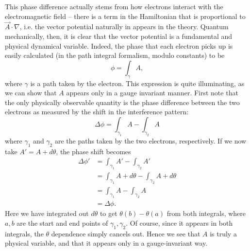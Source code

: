 \documentclass[12pt]{article}
\begin{document}
This phase difference actually stems from how electrons interact with the electromagnetic field -- there is a term in the Hamiltonian that is proportional to $\vec{A}\cdot\nabla$, i.e. the vector potential naturally in appears in the theory. Quantum mechanically, then, it is clear that the vector potential is a fundamental and physical dynamical variable. Indeed, the phase that each electron picks up is easily calculated (in the path integral formalism, modulo constants) to be
\[\phi=\int_\gamma A,\]
where $\gamma$ is a path taken by the electron. This expression is quite illuminating, as we can show that $A$ appears only in a gauge invariant manner. First note that the only physically observable quantity is the phase difference between the two electrons as measured by the shift in the interference pattern:
\[\Delta\phi=\int_{\gamma_1}A-\int_{\gamma_2}A\]
where $\gamma_1$ and $\gamma_2$ are the paths taken by the two
electrons, respectively.
If we now take $A'=A+d\theta$, the phase shift becomes
\begin{align*}
	\Delta\phi'&=\int_{\gamma_1}A'-\int_{\gamma_2}A'\\
    &=\int_{\gamma_1}A+d\theta-\int_{\gamma_2}A+d\theta\\
    &=\int_{\gamma_1}A-\int_{\gamma_2}A\\
    &=\Delta\phi.
\end{align*}
Here we have integrated out $d\theta$ to get $\theta(b)-\theta(a)$ from both integrals, where $a,b$ are the start and end points of $\gamma_1,\gamma_2$. Of course, since it appears in both integrals, the $\theta$ dependence simply cancels out. Hence we see that $A$ is truly a physical variable, and that it appears only in a gauge-invariant way.
\end{document}
